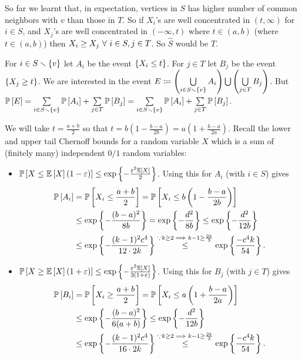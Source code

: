 {\color{gray}So far we learnt that, in expectation, vertices in $S$ has higher number of common neighbors with $v$ than those in $T$. So if $X_{i}$'s are well concentrated in $(t,\infty)$ for $i\in S$, and $X_{j}$'s are well concentrated in $(-\infty,t)$ where $t\in (a,b)$ (where $t\in(a,b)$) then $X_{i}\ge X_{j}~\forall~ i\in S,j\in T$. So $\hat S$ would be $T$.}

For $i\in S\smallsetminus\left\{v\right\}$ let $A_{i}$ be the event $\left\{X_{i} \le t\right\}$. For $j\in T$ let $B_{j}$ be the event $\left\{X_{j} \ge t\right\}$. We are interested in the event $E\coloneqq \left(\bigcup\limits_{i\in S\smallsetminus\left\{v\right\}}A_{i}\right) \bigcup \left(\bigcup\limits_{j\in T}B_{j}\right)$. But $\mathbb P\left[ E \right] = \sum\limits_{i\in S\smallsetminus\left\{v\right\}}\mathbb P\left[ A_{i} \right] + \sum\limits_{j\in T}\mathbb P\left[ B_{j} \right] = \sum\limits_{i\in S\smallsetminus\left\{v\right\}}\mathbb P\left[ A_{i} \right] + \sum\limits_{j\in T}\mathbb P\left[ B_{j} \right]$.

We will take $t = \frac{a+b}{2}$ so that $t=b\left(1-\frac{b-a}{2b}\right) = a\left(1+\frac{b-a}{2a}\right)$. Recall the lower and upper tail Chernoff bounds for a random variable $X$ which is a sum of (finitely many) independent $0/1$ random variables:
\begin{itemize}
\item $\mathbb P\left[ X\le \mathbb E\left[ X \right](1-\varepsilon) \right] \le \exp\left\{-\frac{\varepsilon^{2}\mathbb E\left[ X \right]}{2}\right\}$. Using this for $A_{i}$ (with $i\in S$) gives \begin{align*}
\mathbb P\left[ A_{i} \right] &= \mathbb P\left[ X_{i} \le \frac{a+b}{2} \right] = \mathbb P\left[ X_{i} \le b\left(1-\frac{b-a}{2b}\right) \right] \\
&\le \exp\left\{-\frac{(b-a)^{2}}{8b}\right\} = \exp\left\{-\frac{d^{2}}{8b}\right\} \le \exp\left\{-\frac{d^{2}}{12b}\right\}\\
&\le \exp\left\{-\frac{(k-1)^{2}c^{4}}{12\cdot 2k}\right\} \stackrel{\because k\ge 2\implies k-1\ge\frac{2k}{3}}{\le}  \exp\left\{\frac{-c^{4}k}{54}\right\}.
\end{align*}
\item $\mathbb P\left[ X\ge \mathbb E\left[ X \right](1+\varepsilon) \right] \le \exp\left\{-\frac{\varepsilon^{2}\mathbb E\left[ X \right]}{3(1+\varepsilon)}\right\}$. Using this for $B_{j}$ (with $j\in T$) gives \begin{align*}
\mathbb P\left[ B_{i} \right] &= \mathbb P\left[ X_{i} \ge \frac{a+b}{2} \right] = \mathbb P\left[ X_{i} \le a\left(1+\frac{b-a}{2a}\right) \right] \\
&\le \exp\left\{-\frac{(b-a)^{2}}{6(a+b)}\right\} \le \exp\left\{-\frac{d^{2}}{12b}\right\}\\
&\le \exp\left\{-\frac{(k-1)^{2}c^{4}}{16\cdot 2k}\right\} \stackrel{\because k\ge 2\implies k-1\ge\frac{2k}{3}}{\le}  \exp\left\{\frac{-c^{4}k}{54}\right\}.
\end{align*}
\end{itemize}


